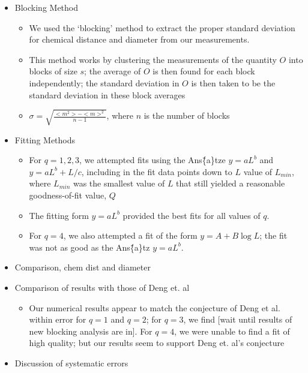 \documentclass[11pt]{article}
\begin{document}
\begin{itemize}
\item Blocking Method
\label{sec-5-3-1}%
\begin{itemize}

\item We used the `blocking' method \cite{NeBa99} to extract the proper standard deviation for chemical distance and diameter from our measurements.\\
\label{sec-5-3-1-1}%
\item This method works by clustering the measurements of the quantity $O$ into blocks of size $s$; the average of $O$ is then found for each block independently;  the standard deviation in $O$ is then taken to be the standard deviation in these block averages\\
\label{sec-5-3-1-2}%
\item $\sigma=\sqrt{ \frac{< m^2 > - < m >  ^2}{n-1}}$, where $n$ is the number of blocks\\
\label{sec-5-3-1-3}%
\end{itemize} %

\item Fitting Methods
\label{sec-5-3-2}%
\begin{itemize}

\item For $q=1,2,3$, we attempted fits using the Ans\"\{a\}tze $y=aL^b$ and $y=aL^b+L/c$, including in the fit data points down to $L$ value of $L_{min}$, where $L_{min}$ was the smallest value of $L$ that still yielded a reasonable goodness-of-fit value, $Q$\\
\label{sec-5-3-2-1}%
\item The fitting form $y=aL^b$ provided the best fits for all values of $q$.\\
\label{sec-5-3-2-2}%
\item For $q=4$, we also attempted a fit of the form $y=A+B \log L$; the fit was not as good as the Ans\"\{a\}tz $y=aL^b$.\\
\label{sec-5-3-2-3}%
\end{itemize} %

\item Comparison, chem dist and diameter\\
\label{sec-5-4-1}%
\item Comparison of results with those of Deng et. al
\label{sec-5-4-2}%
\begin{itemize}

\item Our numerical results appear to match the conjecture of Deng et al. \cite{Deng2010} within error for $q=1$ and $q=2$; for $q=3$, we find [wait until results of new blocking analysis are in].  For $q=4$, we were unable to find a fit of high quality; but our results seem to support Deng et. al's conjecture\\
\label{sec-5-4-2-1}%
\end{itemize} %

\item Discussion of systematic errors\\
\label{sec-5-4-3}%
\end{itemize} %
\end{document}
